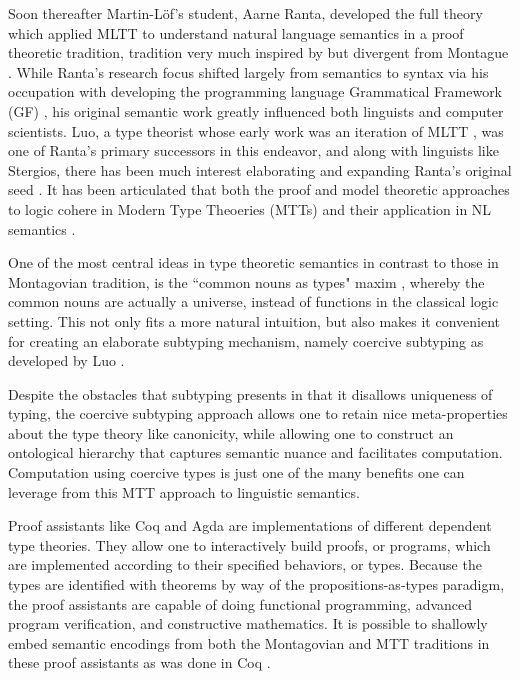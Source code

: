 \documentclass[a4paper, 11pt]{article}
\begin{document}
Soon thereafter Martin-Löf's student, Aarne Ranta, developed the full theory
which applied MLTT to understand natural language semantics in a proof theoretic
tradition, tradition very much inspired by but divergent from Montague
\cite{ranta1994type}. While Ranta's research focus shifted largely from
semantics to syntax via his occupation with developing the programming language
Grammatical Framework (GF) \cite{gf}, his original semantic work greatly
influenced both linguists and computer scientists. Luo, a type theorist whose
early work was an iteration of MLTT \cite{luobook} , was one of Ranta's primary
successors in this endeavor, and along with linguists like Stergios, there has
been much interest elaborating and expanding Ranta's original seed
\cite{cnTypes} \cite{luoSterg}. It has been articulated that both
the proof and model theoretic approaches to logic cohere in Modern Type
Theoeries (MTTs) and their application in NL semantics \cite{luoMt}.

One of the most central ideas in type theoretic semantics in contrast to those
in Montagovian tradition, is the ``common nouns as types" maxim \cite{cnTypes},
whereby the common nouns are actually a universe, instead of functions in the
classical logic setting. This not only fits a more natural intuition, but also
makes it convenient for creating an elaborate subtyping mechanism, namely 
coercive subtyping as developed by Luo \cite{luoCoer} \cite{luo13}.

Despite the obstacles that subtyping presents in that it disallows uniqueness of
typing, the coercive subtyping approach allows one to retain nice
meta-properties about the type theory like canonicity, while allowing one to
construct an ontological hierarchy that captures semantic nuance and facilitates
computation. Computation using coercive types is just one of the many benefits
one can leverage from this MTT approach to linguistic semantics.

Proof assistants like Coq and Agda are implementations of different dependent
type theories. They allow one to interactively build proofs, or programs, which
are implemented according to their specified behaviors, or types. Because the
types are identified with theorems by way of the propositions-as-types paradigm,
the proof assistants are capable of doing functional programming, advanced
program verification, and constructive mathematics. It is possible to shallowly
embed semantic encodings from both the Montagovian and MTT traditions in these
proof assistants as was done in Coq \cite{luoCoq} \cite{fracoq}.
\end{document}
